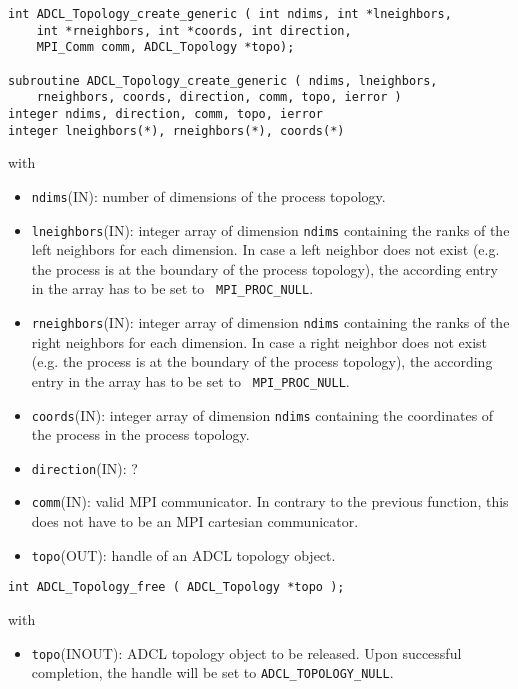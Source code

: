 \hspace{1cm}
\begin{verbatim}
int ADCL_Topology_create_generic ( int ndims, int *lneighbors, 
    int *rneighbors, int *coords, int direction,  
    MPI_Comm comm, ADCL_Topology *topo);
				   
subroutine ADCL_Topology_create_generic ( ndims, lneighbors,
    rneighbors, coords, direction, comm, topo, ierror )
integer ndims, direction, comm, topo, ierror
integer lneighbors(*), rneighbors(*), coords(*)				   
\end{verbatim}
with
\begin{itemize}
\item {\tt ndims}(IN): number of dimensions of the process topology.

\item {\tt lneighbors}(IN): integer array of dimension {\tt ndims} containing
  the ranks of the left neighbors for each dimension. In case a left neighbor
  does not exist (e.g. the process is at the boundary of the process
  topology), the according entry in the array has to be set to {\tt
    MPI\_PROC\_NULL}.

\item {\tt rneighbors}(IN): integer array of dimension {\tt ndims} containing
  the ranks of the right neighbors for each dimension. In case a right
  neighbor does not exist (e.g. the process is at the boundary of the process
  topology), the according entry in the array has to be set to {\tt
    MPI\_PROC\_NULL}.

\item {\tt coords}(IN): integer array of dimension {\tt ndims} containing the coordinates 
  of the process in the process topology.
\item {\tt direction}(IN): ?
\item {\tt comm}(IN): valid MPI communicator. In contrary to the previous
  function, this does not have to be an MPI cartesian communicator.

\item {\tt topo}(OUT): handle of an ADCL topology object.
\end{itemize}

\hspace{1cm}
\begin{verbatim}
int ADCL_Topology_free ( ADCL_Topology *topo );
\end{verbatim}
with
\begin{itemize}
\item {\tt topo}(INOUT): ADCL topology object to be released. Upon successful
  completion, the handle will be set to {\tt ADCL\_TOPOLOGY\_NULL}.
\end{itemize}

